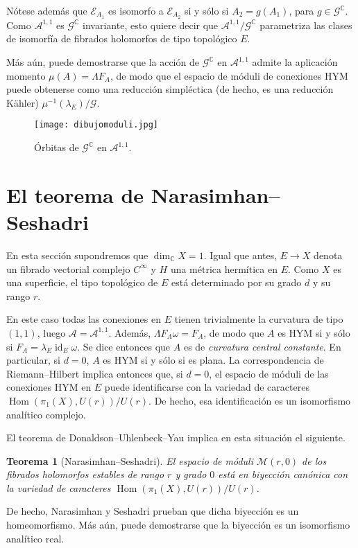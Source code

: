\documentclass[12pt, a4paper]{amsart}
\newcommand\CC{\mathbb{C}}
\newcommand\Aa{\mathcal{A}}
\newcommand\GG{\mathcal{G}}
\newcommand\EE{\mathscr{E}}
\DeclareMathOperator\id{id}
\DeclareMathOperator\Hom{Hom}
\newtheorem{thm}{Teorema}[section]
\theoremstyle{remark} \newtheorem{rmk}[thm]{Observación}
\theoremstyle{remark} \newtheorem{rmks}[thm]{Observaciones}
\theoremstyle{definition} \newtheorem{defn}[thm]{Definición}
\theoremstyle{definition} \newtheorem{ejs}[thm]{Ejemplos}
\theoremstyle{definition} \newtheorem{ej}[thm]{Ejemplo}
\begin{document}
Nótese además que $\EE_{A_1}$ es isomorfo a $\EE_{A_2}$ si y sólo si $A_2=g(A_1)$, para $g\in \GG^\CC$. Como $\Aa^{1,1}$ es $\GG^\CC$ invariante, esto quiere decir que $\Aa^{1,1}/\GG^\CC$ parametriza las clases de isomorfía de fibrados holomorfos de tipo topológico $E$.

Más aún, puede demostrarse que la acción de $\GG^\CC$ en  $\Aa^{1,1}$ admite la aplicación momento $\mu(A)=\Lambda F_A$, de modo que el espacio de móduli de conexiones HYM puede obtenerse como una reducción simpléctica (de hecho, es una reducción Kähler) $\mu^{-1}(\lambda_E)/\GG$.

\begin{figure}[hb]
	\centering
\texttt{[image: dibujomoduli.jpg]}	
\caption{Órbitas de $\GG^\CC$ en  $\Aa^{1,1}$.}
\end{figure}

\section{El teorema de Narasimhan--Seshadri}
En esta sección supondremos que $\dim_\CC X = 1$. Igual que antes,  $E\rightarrow X$ denota un fibrado vectorial complejo $C^\infty$ y $H$ una métrica hermítica en $E$. Como $X$ es una superficie, el tipo topológico de $E$ está determinado por su grado $d$ y su rango $r$. 

En este caso todas las conexiones en $E$ tienen trivialmente la curvatura de tipo $(1,1)$, luego $\Aa=\Aa^{1,1}$. Además, $\Lambda F_A \omega = F_A$, de modo que $A$ es HYM si y sólo si $F_A=\lambda_E \id_E \omega$. Se dice entonces que  $A$ es de \emph{curvatura central constante}. En particular, si $d=0$,  $A$ es HYM si y sólo si es plana. La correspondencia de Riemann--Hilbert implica entonces que, si $d=0$, el espacio de móduli de las conexiones HYM en $E$ puede identificarse con la variedad de caracteres $\Hom(\pi_1(X),U(r))/U(r)$. De hecho, esa identificación es un isomorfismo analítico complejo.

El teorema de Donaldson--Uhlenbeck--Yau implica en esta situación el siguiente.

\begin{thm}[Narasimhan--Seshadri]
	El espacio de móduli $\mathcal{M}(r,0)$ de los fibrados holomorfos estables de rango $r$ y grado $0$ está en biyección canónica con la variedad de caracteres $\Hom(\pi_1(X),U(r))/U(r)$.
\end{thm}

De hecho, Narasimhan y Seshadri prueban que dicha biyección es un homeomorfismo. Más aún, puede demostrarse que la biyección es un isomorfismo analítico real.
\end{document}
